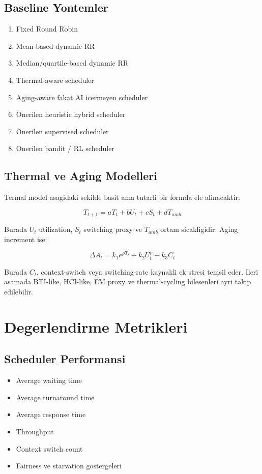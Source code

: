 \documentclass[12pt,a4paper]{article}
\begin{document}
\subsection{Baseline Yontemler}

\begin{enumerate}[leftmargin=*]
\item Fixed Round Robin
\item Mean-based dynamic RR
\item Median/quartile-based dynamic RR
\item Thermal-aware scheduler
\item Aging-aware fakat AI icermeyen scheduler
\item Onerilen heuristic hybrid scheduler
\item Onerilen supervised scheduler
\item Onerilen bandit / RL scheduler
\end{enumerate}

\subsection{Thermal ve Aging Modelleri}

Termal model asagidaki sekilde basit ama tutarli bir formda ele alinacaktir:

\[
T_{t+1} = aT_t + bU_t + cS_t + dT_{amb}
\]

Burada $U_t$ utilization, $S_t$ switching proxy ve $T_{amb}$ ortam sicakligidir. Aging increment ise:

\[
\Delta A_t = k_1 e^{\rho T_t} + k_2 U_t^p + k_3 C_t
\]

Burada $C_t$, context-switch veya switching-rate kaynakli ek stresi temsil eder. Ileri asamada BTI-like,
HCI-like, EM proxy ve thermal-cycling bilesenleri ayri takip edilebilir.

\section{Degerlendirme Metrikleri}

\subsection{Scheduler Performansi}

\begin{itemize}[leftmargin=*]
\item Average waiting time
\item Average turnaround time
\item Average response time
\item Throughput
\item Context switch count
\item Fairness ve starvation gostergeleri
\end{itemize}
\end{document}
